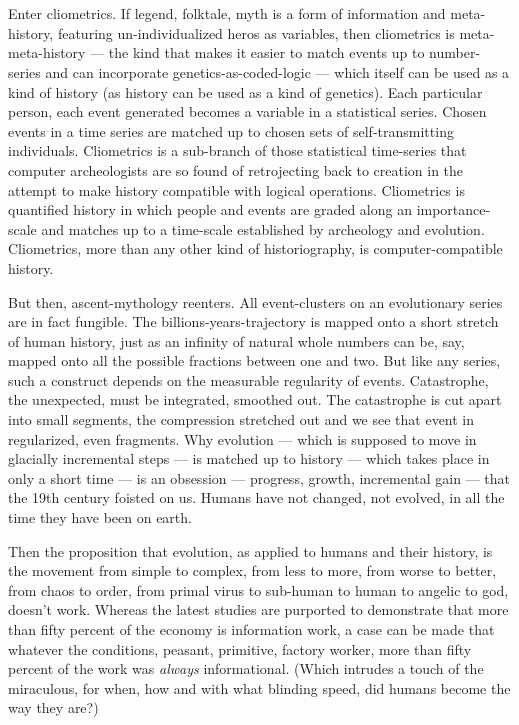 \chapter{}

Enter cliometrics. If legend, folktale, myth is a form of information and meta-history, featuring un-individualized heros as variables, then cliometrics is meta-meta-history --- the kind that makes it easier to match events up to number-series and can incorporate genetics-as-coded-logic --- which itself can be used as a kind of history (as history can be used as a kind of genetics). Each particular person, each event generated becomes a variable in a statistical series. Chosen events in a time series are matched up to chosen sets of self-transmitting individuals. Cliometrics is a sub-branch of those statistical time-series that computer archeologists are so found of retrojecting back to creation in the attempt to make history compatible with logical operations. Cliometrics is quantified history in which people and events are graded along an importance-scale and matches up to a time-scale established by archeology and evolution. Cliometrics, more than any other kind of historiography, is computer-compatible history.

But then, ascent-mythology reenters. All event-clusters on an evolutionary series are in fact fungible. The billions-years-trajectory is mapped onto a short stretch of human history, just as an infinity of natural whole numbers can be, say, mapped onto all the possible fractions between one and two. But like any series, such a construct depends on the measurable regularity of events. Catastrophe, the unexpected, must be integrated, smoothed out. The catastrophe is cut apart into small segments, the compression stretched out and we see that event in regularized, even fragments. Why evolution --- which is supposed to move in glacially incremental steps --- is matched up to history --- which takes place in only a short time --- is an obsession --- progress, growth, incremental gain --- that the 19th century foisted on us. Humans have not changed, not evolved, in all the time they have been on earth.

Then the proposition that evolution, as applied to humans and their history, is the movement from simple to complex, from less to more, from worse to better, from chaos to order, from primal virus to sub-human to human to angelic to god, doesn't work. Whereas the latest studies are purported to demonstrate that more than fifty percent of the economy is information work, a case can be made that whatever the conditions, peasant, primitive, factory worker, more than fifty percent of the work was \emph{always} informational. (Which intrudes a touch of the miraculous, for when, how and with what blinding speed, did humans become the way they are?)

